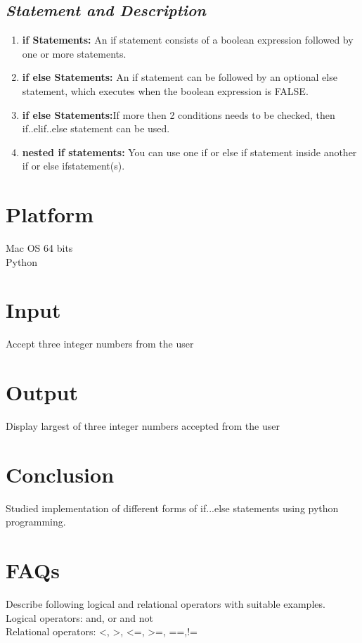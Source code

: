 \documentclass{article}
\begin{document}
\subsection{\textbf{\textit{Statement and Description}}}
\begin{enumerate}
	\item \textbf{if Statements:} An if statement consists of a boolean expression followed by one or more statements.
	\item \textbf{if else Statements:} An if statement can be followed by an optional else statement, which executes when the boolean expression is FALSE.
	\item \textbf{if else Statements:}If more then 2 conditions needs to be checked, then if..elif..else statement can be used.
	\item \textbf{nested if statements:} You can use one if or else if statement inside another if or else ifstatement(s).
\end{enumerate}
\section{\textbf{Platform}} Mac OS 64 bits\\
Python
\section{\textbf{Input}} 
Accept three integer numbers from the user
\section{\textbf{Output}} 
Display largest of three integer numbers accepted from the user
\section{\textbf{Conclusion}} 
Studied implementation of different forms of if...else statements using python programming.
\section{\textbf{FAQs}} 
 Describe following logical and relational operators with suitable examples.\\
Logical operators: and, or and not\\
Relational operators: <, >, <=, >=, ==,!=
\end{document}
